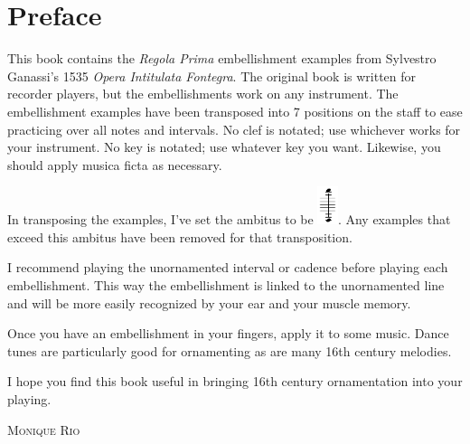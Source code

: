 \documentclass[11pt]{book}
\begin{document}

\setcounter{page}{1}
\section*{Preface}
This book contains the \textit{Regola Prima} embellishment examples from Sylvestro Ganassi's 1535 \textit{Opera Intitulata Fontegra}.	The original book is written for recorder players, but the embellishments work on any instrument. The embellishment examples have been transposed into 7 positions on the staff to ease practicing over all notes and intervals. No clef is notated; use whichever works for your instrument. No key is notated; use whatever key you want. Likewise, you should apply musica ficta as necessary. 

In transposing the examples, I've set the ambitus to be \includegraphics[height=3em]{snippit.png}. Any examples that exceed this ambitus have been removed for that transposition. 


I recommend playing the unornamented interval or cadence before playing each embellishment. This way the embellishment is linked to the unornamented line and will be more easily recognized by your ear and your muscle memory. 

Once you have an embellishment in your fingers, apply it to some music. Dance tunes are particularly good for ornamenting as are many 16th century melodies.

I hope you find this book useful in bringing 16th century ornamentation into your playing. 
\begin{flushright}
\textsc{Monique Rio}
\end{flushright}

\clearpage
{}
\setcounter{page}{1}
\thispagestyle{FooBar}



\thispagestyle{FooBar}

\end{document}
